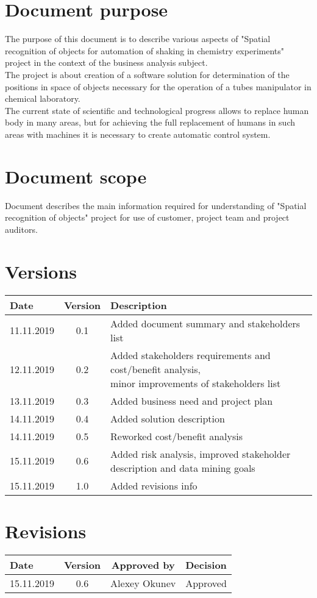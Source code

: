 \section{Document purpose} 

The purpose of this document is to describe various aspects of "Spatial recognition of objects
for automation of shaking in chemistry experiments" project in the context of the business analysis subject.
\\
The project is about creation of a software solution for determination of the positions
in space of objects necessary for the operation of a tubes manipulator in chemical laboratory.
\\
The current state of scientific and technological progress allows to replace human body
in many areas, but for achieving the full replacement of humans in such areas with machines
it is necessary to create automatic control system.


\section{Document scope}

Document describes the main information required for understanding of "Spatial recognition of objects"
project for use of customer, project team and project auditors.


\section{Versions}


\begin{tabular}{ | l | c | l | }
	\hline
	Date & Version & Description \\ \hline
	11.11.2019 &  0.1 & Added document summary and stakeholders list \\ \hline
	12.11.2019 &  0.2 & \specialcell{Added stakeholders requirements and cost/benefit analysis,\\ minor improvements of stakeholders list} \\ \hline
	13.11.2019 &  0.3 & Added business need and project plan \\ \hline
	14.11.2019 &  0.4 & Added solution description \\ \hline
	14.11.2019 &  0.5 & Reworked cost/benefit analysis \\ \hline
	15.11.2019 &  0.6 & Added risk analysis, improved stakeholder description and data mining goals \\ \hline
	15.11.2019 &  1.0 & Added revisions info \\ \hline
\end{tabular}


\section{Revisions}

\begin{tabular}{ | l | c | c | l | }
	\hline
	Date & Version & Approved by & Decision \\ \hline
	15.11.2019 & 0.6 & Alexey Okunev & Approved \\ \hline
\end{tabular}
